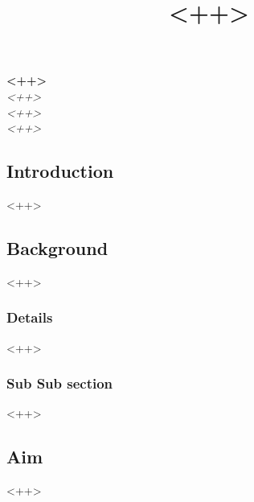 \documentclass[a4paper]{article}
\title{
    \textbf{<++>} 
}
\date{} %
\begin{document}
\maketitle
\vspace{-1.5cm}

\centering
\textbf{<++>}\\ %
\textit{<++>}\\ %
\textit{<++>}\\ %
\textit{<++>}\\ %

\singlespacing
\setlength{\parskip}{6pt}
\setlength{\parindent}{0.5cm}

\begin{multicols}{2}
\setlength{\columnsep}{0.5cm}

\section{Introduction}
<++>

\subsection{Background}
<++>

\subsubsection{Details}
<++>

\subsubsection{Sub Sub section}
<++>



\subsection{Aim}
<++>


\end{multicols}
\end{document}
